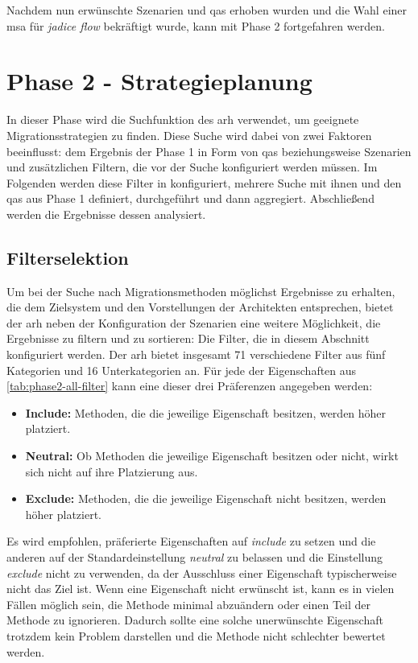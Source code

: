 Nachdem nun erwünschte Szenarien und \glspl{qa} erhoben wurden und die Wahl einer \gls{msa} für \emph{jadice flow} bekräftigt wurde, kann mit Phase 2 fortgefahren werden.

\section{Phase 2 - Strategieplanung}
\label{sec:durchführung-phase2}

In dieser Phase wird die Suchfunktion des \gls{arh} verwendet, um geeignete Migrationsstrategien zu finden.
Diese Suche wird dabei von zwei Faktoren beeinflusst: dem Ergebnis der Phase 1 in Form von \glspl{qa} beziehungsweise Szenarien und zusätzlichen Filtern, die vor der Suche konfiguriert werden müssen.
Im Folgenden werden diese Filter in konfiguriert, mehrere Suche mit ihnen und den \glspl{qa} aus Phase 1 definiert, durchgeführt und dann aggregiert.
Abschließend werden die Ergebnisse dessen analysiert.

\subsection{Filterselektion}
\label{sec:filterselektion}

Um bei der Suche nach Migrationsmethoden möglichst Ergebnisse zu erhalten, die dem Zielsystem und den Vorstellungen der Architekten entsprechen, bietet der \gls{arh} neben der Konfiguration der Szenarien eine weitere Möglichkeit, die Ergebnisse zu filtern und zu sortieren:
Die Filter, die in diesem Abschnitt konfiguriert werden.
Der \gls{arh} bietet insgesamt 71 verschiedene Filter aus fünf Kategorien und 16 Unterkategorien an.
Für jede der Eigenschaften aus \cref{tab:phase2-all-filter} kann eine dieser drei Präferenzen angegeben werden:
\begin{itemize}
	\item \textbf{Include:} Methoden, die die jeweilige Eigenschaft besitzen, werden höher platziert.
	\item \textbf{Neutral:} Ob Methoden die jeweilige Eigenschaft besitzen oder nicht, wirkt sich nicht auf ihre Platzierung aus.
	\item \textbf{Exclude:} Methoden, die die jeweilige Eigenschaft nicht besitzen, werden höher platziert.
\end{itemize}



Es wird empfohlen, präferierte Eigenschaften auf \emph{include} zu setzen und die anderen auf der Standardeinstellung \emph{neutral} zu belassen und die Einstellung \emph{exclude} nicht zu verwenden, da der Ausschluss einer Eigenschaft typischerweise nicht das Ziel ist.
Wenn eine Eigenschaft nicht erwünscht ist, kann es in vielen Fällen möglich sein, die Methode minimal abzuändern oder einen Teil der Methode zu ignorieren.
Dadurch sollte eine solche unerwünschte Eigenschaft trotzdem kein Problem darstellen und die Methode nicht schlechter bewertet werden.

